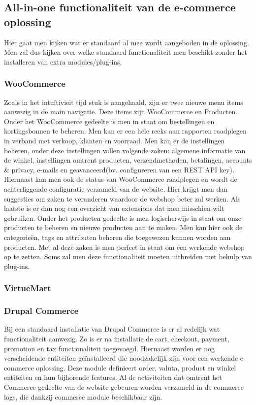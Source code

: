 \subsection{All-in-one functionaliteit van de e-commerce oplossing}
Hier gaat men kijken wat er standaard al mee wordt aangeboden in de oplossing. Men zal dus kijken over welke standaard functionaliteit men beschikt zonder het installeren van extra modules/plug-ins.
\subsubsection{WooCommerce}
Zoals in het intuïtivieit tijd stuk is aangehaald, zijn er twee nieuwe menu items aanwezig in de main navigatie. Deze items zijn WooCommerce en Producten. Onder het WooCommerce gedeelte is men in staat om bestellingen en kortingsbonnen te beheren. Men kan er een hele reeks aan rapporten raadplegen in verband met verkoop, klanten en voorraad. Men kan er de instellingen beheren, onder deze instellingen vallen volgende zaken: algemene informatie van de winkel, instellingen omtrent producten, verzendmethoden, betalingen, accounts \& privacy, e-mails en geavanceerd(bv. configureren van een REST API key). Hiernaast kan men ook de status van WooCommerce raadplegen en wordt de achterliggende configuratie verzameld van de website. Hier krijgt men dan suggesties om zaken te veranderen waardoor de webshop beter zal werken. Als laatste is er dan nog een overzicht van extensions dat men misschien wilt gebruiken. Onder het producten gedeelte is men logischerwijs in staat om onze producten te beheren en nieuwe producten aan te maken. Men kan hier ook de categorieën, tags en attributen beheren die toegewezen kunnen worden aan producten. Met al deze zaken is men perfect in staat om een werkende webshop op te zetten. Soms zal men deze functionaliteit moeten uitbreiden met behulp van plug-ins.

\subsubsection{VirtueMart}

\subsubsection{Drupal Commerce}
Bij een standaard installatie van Drupal Commerce is er al redelijk wat functionaliteit aanwezig. Zo is er na installatie de cart, checkout, payment, promotion en tax functionaliteit toegevoegd. Hiernaast worden er nog verscheidende entiteiten geïnstalleerd die noodzakelijk zijn voor een werkende e-commerce oplossing. Deze module definieert order, valuta, product en winkel entiteiten en hun bijhorende features. Al de activiteiten dat omtrent het Commerce gedeelte van de website gebeuren worden verzameld in de commerce logs, die dankzij commerce module beschikbaar zijn. 

